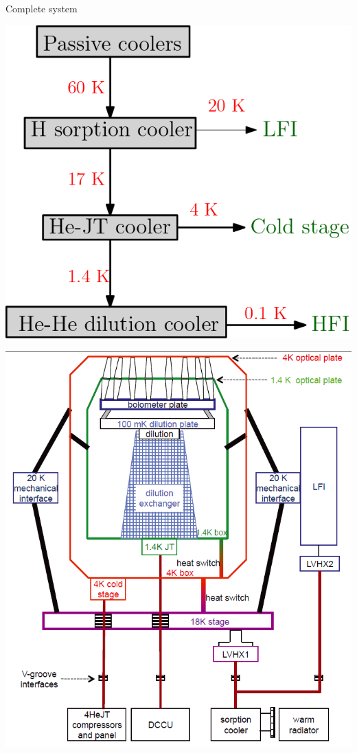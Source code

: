 \documentclass{cubeamer}
\begin{document}
\begin{frame}{Complete system}
\begin{minipage}{0.45\textwidth}
    \includegraphics[width=0.9\linewidth]{Figures/complete.png} 
\end{minipage}
\begin{minipage}{0.45\textwidth}
    \includegraphics[width=0.9\linewidth]{Figures/Diag_complete.png} 
\end{minipage}
\end{frame}
\end{document}
